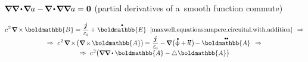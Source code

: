 ${\boldnabla \boldnabla \hspace{-0.2ex} \dotp \hspace{-0.25ex} \boldnabla a - \hspace{-0.2ex} \boldnabla \hspace{-0.2ex} \dotp \hspace{-0.25ex} \boldnabla \boldnabla a = \bm{0}}$ (partial derivatives of a~smooth function commute)

\nopagebreak\vspace{-0.4em}\begin{multline}\label{electromagnetic.secondequationofwave}
c^{\hspace{.16ex}2} \hspace{.22ex} \boldnabla \hspace{-0.15ex} \times \hspace{-0.1ex} \boldmathbb{B}
= \displaystyle \frac{\currentdensity}{\raisemath{.16em}{\vacuumpermittivity}} + \hspace{.1ex} \mathdotabove{\boldmathbb{E}}
\;\;\eqref{maxwell.equations:ampere.circuital.with.addition}
\hspace{.44em} \Rightarrow
%
\\[-0.4em]
%
\Rightarrow \hspace{.33em}
c^{\hspace{.16ex}2} \hspace{.22ex} \boldnabla \hspace{-0.2ex} \times \hspace{-0.3ex} \bigl( \boldnabla \hspace{-0.2ex} \times \hspace{-0.2ex} \boldmathbb{A} \bigr) \hspace{-0.15ex}
= \hspace{.1ex} \displaystyle \frac{\currentdensity}{\raisemath{.16em}{\vacuumpermittivity}} - \hspace{-0.15ex} \boldnabla \hspace{.1ex} \bigl( \mathdotabove{\upphi} \hspace{-0.1ex} + \mathdotdotabove{a} \hspace{.2ex} \bigr) \hspace{-0.3ex} - \mathdotdotabove{\boldmathbb{A}}
\hspace{.44em} \Rightarrow
%
\\[-0.4em]
%
\Rightarrow \hspace{.33em}
c^{\hspace{.16ex}2} \bigl( \boldnabla \boldnabla \hspace{-0.1ex} \dotp \boldmathbb{A} - \Laplacian \hspace{.05ex} \boldmathbb{A} \bigr) \hspace{-0.15ex}

\end{multline}
